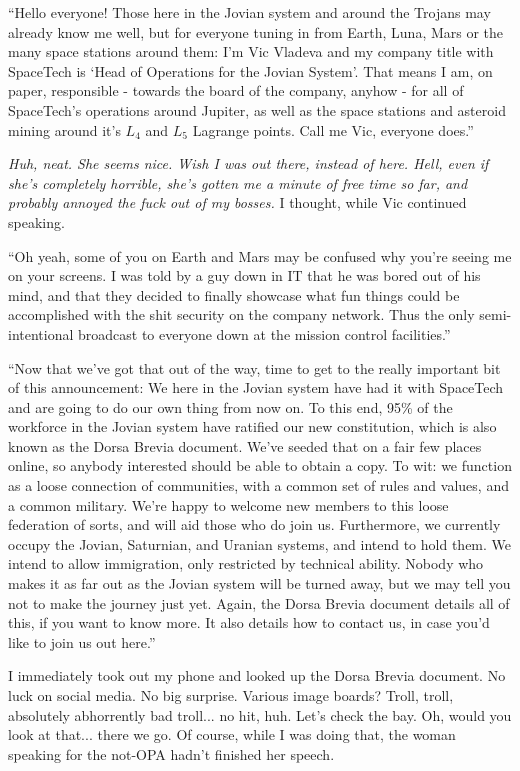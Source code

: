 ``Hello everyone! Those here in the Jovian system and around the Trojans
may already know me well, but
for everyone tuning in from Earth, Luna, Mars or the many space stations around
them: I'm Vic Vladeva and my company title with SpaceTech
is `Head of Operations for the Jovian System'. That means I am, on paper,
responsible - towards the board of the company, anyhow - for all of SpaceTech's
operations around Jupiter, as well as the space stations and asteroid mining
around it's $L_4$ and $L_5$ Lagrange points. Call me Vic, everyone does.''

\textit{Huh, neat. She seems nice. Wish I was out there, instead of here. Hell,
  even if she's completely horrible, she's gotten me a minute of free time so
  far, and probably annoyed the fuck out of my bosses.} I thought, while Vic
continued speaking.

``Oh yeah, some of you on Earth and Mars may be confused why you're seeing me on
your screens. I was told by a guy down in IT that he was bored out of his mind,
and that they decided to finally showcase what fun things could be accomplished
with the shit security on the company network. Thus the only semi-intentional
broadcast to everyone down at the mission control facilities.''

``Now that we've got that out of the way, time to get to the really important
bit of this announcement: We here in the Jovian system have had it with
SpaceTech and are going to do our own thing from now on. To this end, 95\% of
the workforce in the Jovian system have ratified our new constitution, which is
also known as the Dorsa Brevia document. We've seeded that on a fair few places
online, so anybody interested should be able to obtain a copy. To wit: we
function as a loose connection of communities, with a common set of rules and
values, and a common military. We're happy to welcome new members to this loose
federation of sorts, and will aid those who do join us. Furthermore, we
currently occupy the Jovian, Saturnian, and Uranian systems, and intend to hold
them. We intend to allow immigration, only restricted by technical ability.
Nobody who makes it as far out as the Jovian system will be turned away, but we
may tell you not to make the journey just yet. Again, the Dorsa Brevia document
details all of this, if you want to know more. It also details how to contact
us, in case you'd like to join us out here.''

I immediately took out my phone and looked up the Dorsa Brevia document. No luck
on social media. No big surprise. Various image boards?
Troll, troll, absolutely abhorrently bad troll... no hit, huh. Let's check the
bay. Oh, would you look at that... there we go. Of course, while I was doing
that, the woman speaking for the not-OPA hadn't finished her speech.

